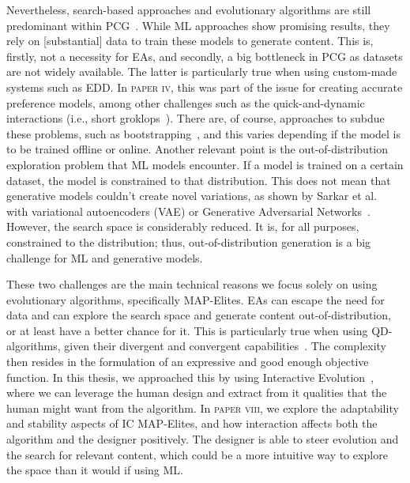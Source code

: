 Nevertheless, search-based approaches and evolutionary algorithms are still predominant within PCG~\cite{liapis_10_2020}. While ML approaches show promising results, they rely on [substantial] data to train these models to generate content. This is, firstly, not a necessity for EAs, and secondly, a big bottleneck in PCG as datasets are not widely available. The latter is particularly true when using custom-made systems such as EDD. In \textsc{paper iv}, this was part of the issue for creating accurate preference models, among other challenges such as the quick-and-dynamic interactions (i.e., short groklops~\cite{compton_casual_2015}). There are, of course, approaches to subdue these problems, such as bootstrapping~\cite{torrado_bootstrapping_2020}, and this varies depending if the model is to be trained offline or online. Another relevant point is the out-of-distribution exploration problem that ML models encounter. If a model is trained on a certain dataset, the model is constrained to that distribution. This does not mean that generative models couldn't create novel variations, as shown by Sarkar et al.~\cite{sarkar_generating_2021} with variational autoencoders (VAE) or Generative Adversarial Networks~\cite{goodfellow_deep_2016}. However, the search space is considerably reduced. It is, for all purposes, constrained to the distribution; thus, out-of-distribution generation is a big challenge for ML and generative models. 

These two challenges are the main technical reasons we focus solely on using evolutionary algorithms, specifically MAP-Elites. EAs can escape the need for data and can explore the search space and generate content out-of-distribution, or at least have a better chance for it. This is particularly true when using QD-algorithms, given their divergent and convergent capabilities~\cite{pugh_quality_2016}. The complexity then resides in the formulation of an expressive and good enough objective function. In this thesis, we approached this by using Interactive Evolution~\cite{takagi_interactive_2001}, where we can leverage the human design and extract from it qualities that the human might want from the algorithm. In \textsc{paper viii}, we explore the adaptability and stability aspects of IC MAP-Elites, and how interaction affects both the algorithm and the designer positively. The designer is able to steer evolution and the search for relevant content, which could be a more intuitive way to explore the space than it would if using ML.


